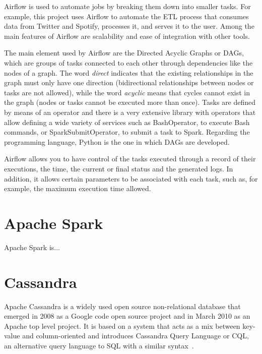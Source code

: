 \nonzeroparskip Airflow is used to automate jobs by breaking them down into smaller tasks. For example, this project uses Airflow to automate the ETL process that consumes data from Twitter and Spotify, processes it, and serves it to the user. Among the main features of Airflow are scalability and ease of integration with other tools.

\nonzeroparskip The main element used by Airflow are the Directed Acyclic Graphs or DAGs, which are groups of tasks connected to each other through dependencies like the nodes of a graph. The word \textit{direct} indicates that the existing relationships in the graph must only have one direction (bidirectional relationships between nodes or tasks are not allowed), while the word \textit{acyclic} means that cycles cannot exist in the graph (nodes or tasks cannot be executed more than once). Tasks are defined by means of an operator and there is a very extensive library with operators that allow defining a wide variety of services such as BashOperator, to execute Bash commands, or SparkSubmitOperator, to submit a task to Spark. Regarding the programming language, Python is the one in which DAGs are developed.

\nonzeroparskip Airflow allows you to have control of the tasks executed through a record of their executions, the time, the current or final status and the generated logs. In addition, it allows certain parameters to be associated with each task, such as, for example, the maximum execution time allowed.

\section{Apache Spark}

\nonzeroparskip Apache Spark is...

\section{Cassandra}

\nonzeroparskip Apache Cassandra is a widely used open source non-relational database that emerged in 2008 as a Google code open source project and in March 2010 as an Apache top level project. It is based on a system that acts as a mix between key-value and column-oriented and introduces Cassandra Query Language or CQL, an alternative query language to SQL with a similar syntax~\cite{cassandra,wikipedia_cassandra}.

